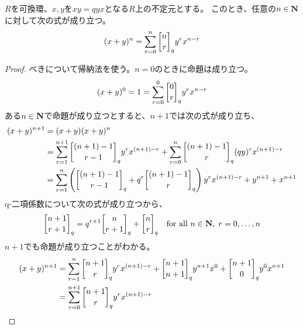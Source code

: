 {	\begin{proposition}[Schutzenbergerの公式]
	\label{prop:Schutzenbergerの公式} %
		$R$を可換環、$x,y$を$xy=qyx$となる$R$上の不定元とする。
		このとき、任意の$n\in\mathbf{N}$に対して次の式が成り立つ。
		\begin{equation*}\begin{split}
			(x + y)^n = \sum_{r=0}^n\qbinom{n}{r}_q y^rx^{n-r}
		\end{split}\end{equation*}
	\end{proposition} %
	\begin{proof} %
		べきについて帰納法を使う。$n=0$のときに命題は成り立つ。
		\begin{equation*}\begin{split}
			(x+y)^0 = 1 = \sum_{r=0}^0\qbinom{0}{r}_q y^rx^{n-r}
		\end{split}\end{equation*}
		ある$n\in\mathbf{N}$で命題が成り立つとすると、$n+1$では次の式が成り立ち、
		\begin{equation*}\begin{split}
			(x+y)^{n+1} &= (x+y)(x+y)^n \\
			&= \sum_{r=1}^{n+1} \qbinom{(n+1) - 1}{r - 1}_q y^rx^{(n+1) - r}
				+ \sum_{r=0}^{n} \qbinom{(n+1) - 1}{r}_q (qy)^rx^{(n+1) - r} \\
			&= \sum_{r=1}^n \plr{
				\qbinom{(n+1) - 1}{r - 1}_q + q^r\qbinom{(n+1) - 1}{r}_q} 
				y^rx^{(n+1) - r} + y^{n+1} + x^{n+1} \\
		\end{split}\end{equation*}
		q-二項係数について次の式が成り立つから、
		\begin{equation*}\begin{split}
			\qbinom{n+1}{r+1}_q = q^{r+1}\qbinom{n}{r+1}_q + \qbinom{n}{r}_q
			\quad\text{for all } n\in\sizen,\; r=0,\dots,n
		\end{split}\end{equation*}
		$n+1$でも命題が成り立つことがわかる。
		\begin{equation*}\begin{split}
			(x+y)^{n+1} &= \sum_{r=1}^n \qbinom{n+1}{r}_q y^rx^{(n+1)-r}
			+ \qbinom{n+1}{n+1}_q y^{n+1}x^0 + \qbinom{n+1}{0}_q y^0x^{n+1} \\
			&= \sum_{r=0}^{n+1} \qbinom{n+1}{r}_q y^rx^{(n+1)-r}
		\end{split}\end{equation*}
	\end{proof} %

}
